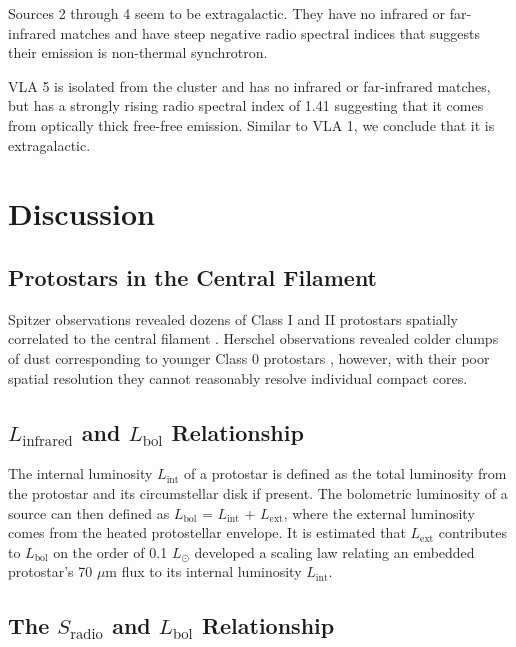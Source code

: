 \documentclass[apj]{emulateapj}
\begin{document}
Sources 2 through 4 seem to be extragalactic. They have no infrared or far-infrared matches and have steep negative radio spectral indices that suggests their emission is non-thermal synchrotron.

VLA 5 is isolated from the cluster and has no infrared or far-infrared matches, but has a strongly rising radio spectral index of 1.41 suggesting that it comes from optically thick free-free emission. Similar to VLA 1, we conclude that it is extragalactic. 





\section{Discussion}

\subsection{Protostars in the Central Filament}
Spitzer observations revealed dozens of Class I and II protostars spatially correlated to the central filament \citep{Gutermuth08}. Herschel observations revealed colder clumps of dust corresponding to younger Class 0 protostars \citep{Bontemps10}, however, with their poor spatial resolution they cannot reasonably resolve individual compact cores. 


\subsection{$L_{\text{infrared}}$ and $L_{\text{bol}}$ Relationship}

The internal luminosity $L_{\text{int}}$ of a protostar is defined as the total luminosity from the protostar and its circumstellar disk if present. The bolometric luminosity of a source can then defined as $L_{\text{bol}}$ = $L_{\text{int}}$ + $L_{\text{ext}}$, where the external luminosity comes from the heated protostellar envelope. It is estimated that $L_{\text{ext}}$ contributes to $L_{\text{bol}}$ on the order of 0.1 $L_{\odot}$ \citet{Dunham08} developed a scaling law relating an embedded protostar's 70 $\mu$m flux to its internal luminosity $L_{\text{int}}$.



\subsection{The $S_{\text{radio}}$ and $L_{\text{bol}}$ Relationship}
\end{document}
